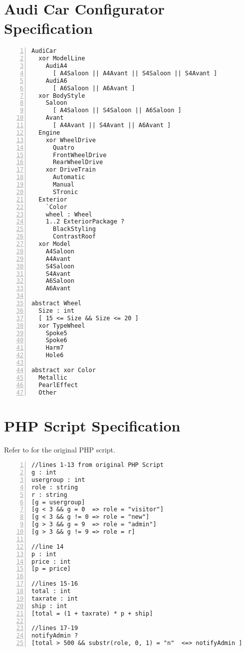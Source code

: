 \documentclass{easychair}
\begin{document}


\appendix
\section{Audi Car Configurator Specification}
\label{appendix}
\begin{lstlisting}[language=clafer, numbers=left]
AudiCar
  xor ModelLine
    AudiA4
      [ A4Saloon || A4Avant || S4Saloon || S4Avant ]
    AudiA6
      [ A6Saloon || A6Avant ]
  xor BodyStyle
    Saloon
      [ A4Saloon || S4Saloon || A6Saloon ]
    Avant
      [ A4Avant || S4Avant || A6Avant ]
  Engine
    xor WheelDrive
      Quatro
      FrontWheelDrive 
      RearWheelDrive 
    xor DriveTrain
      Automatic
      Manual
      STronic
  Exterior
    `Color
    wheel : Wheel
    1..2 ExteriorPackage ?
      BlackStyling
      ContrastRoof
  xor Model
    A4Saloon
    A4Avant
    S4Saloon
    S4Avant
    A6Saloon
    A6Avant

abstract Wheel
  Size : int
  [ 15 <= Size && Size <= 20 ]
  xor TypeWheel
    Spoke5
    Spoke6
    Harm7
    Hole6

abstract xor Color
  Metallic
  PearlEffect
  Other
\end{lstlisting}%

\section{PHP Script Specification}
\label{appendix2}
Refer to \cite{Zheng2013} for the original PHP script.

\begin{lstlisting}[language=clafer, numbers=left]
//lines 1-13 from original PHP Script
g : int
usergroup : int
role : string
r : string
[g = usergroup]
[g < 3 && g = 0  => role = "visitor"]
[g < 3 && g != 0 => role = "new"]
[g > 3 && g = 9  => role = "admin"]
[g > 3 && g != 9 => role = r]

//line 14
p : int
price : int
[p = price]

//lines 15-16
total : int
taxrate : int
ship : int
[total = (1 + taxrate) * p + ship] 

//lines 17-19
notifyAdmin ?
[total > 500 && substr(role, 0, 1) = "n"  <=> notifyAdmin ] 
\end{lstlisting}%
\end{document}
